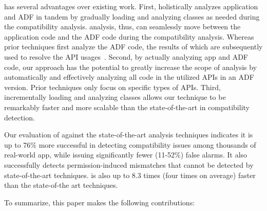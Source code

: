\@approach has several advantages over existing work.
First, \@approach holistically analyzes application and
ADF in tandem by gradually loading and analyzing
classes as needed during the compatibility analysis.
\@approach analysis, thus, can seamlessly move between
the application code and the ADF code during the
compatibility analysis.  Whereas prior techniques first
analyze the ADF code, the results of which are
subsequently used to resolve the API
usages~\cite{huang2018understanding,linttips,
lili2018cid}. Second, by actually analyzing app and ADF
code, our approach has the potential to greatly
increase the scope of analysis by automatically and
effectively analyzing all code in the utilized APIs in
an ADF version.  Prior techniques only focus on
specific types of APIs.  Third, incrementally loading
and analyzing classes allows our technique to be
remarkably faster and more scalable than the
state-of-the-art in compatibility detection.  

\newpage
Our evaluation of \@approach against the
state-of-the-art analysis techniques indicates it 
is up to 76\% more successful in detecting
compatibility issues among thousands of real-world app, while issuing significantly fewer
(11-52\%) false alarms.  It also successfully detects
permission-induced mismatches that cannot be
detected by state-of-the-art techniques. 
\@approach is also up to 8.3 times (four times on average)
faster than the state-of-the art techniques. 


To summarize,
this paper makes the following contributions:
 
